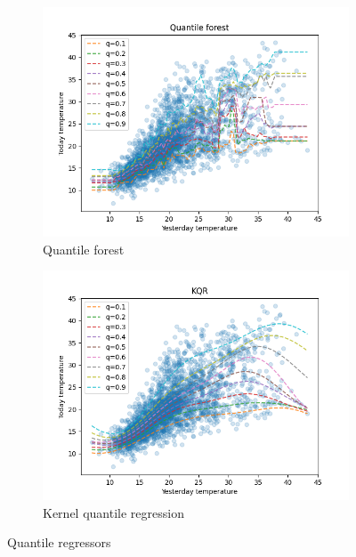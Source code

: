 \begin{figure}[!h]
\begin{subfigure}[b]{0.5\linewidth}
      \vspace{4ex}
    \end{subfigure} 
    \begin{subfigure}[b]{0.5\linewidth}
      \centering
      \includegraphics[width=1.1\textwidth]{images/melbourne_quantile_forest.png} 
      \caption{Quantile forest} 
      \label{fig:melbourne_quantile_forest} 
    \end{subfigure}%
    \begin{subfigure}[b]{0.5\linewidth}
      \centering
      \includegraphics[width=1.1\textwidth]{images/melbourne_kernel_quantile_regression.png}
      \caption{Kernel quantile regression} 
      \label{fig:melborune_kernel_quantile_regression} 
    \end{subfigure} 
    \caption{Quantile regressors}
    \label{fig:melbourne_quantiles_comparison} 
  \end{figure}

